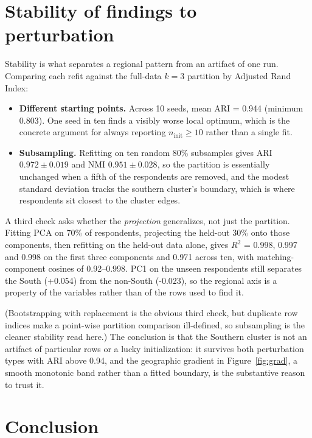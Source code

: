 \documentclass[10pt,letterpaper]{article}
\begin{document}
\section{Stability of findings to perturbation}\label{stability}

Stability is what separates a regional pattern from an artifact of one run.
Comparing each refit against the full-data $k=3$ partition by Adjusted Rand
Index:

\begin{itemize}
\item \textbf{Different starting points.} Across 10 seeds, mean ARI = 0.944
(minimum 0.803). One seed in ten finds a visibly worse local optimum, which is
the concrete argument for always reporting $n_{\mathrm{init}} \geq 10$ rather
than a single fit.
\item \textbf{Subsampling.} Refitting on ten random 80\% subsamples gives ARI
$0.972 \pm 0.019$ and NMI $0.951 \pm 0.028$, so the partition is essentially
unchanged when a fifth of the respondents are removed, and the modest standard
deviation tracks the southern cluster's boundary, which is where respondents
sit closest to the cluster edges.
\end{itemize}

A third check asks whether the \emph{projection} generalizes, not just the
partition. Fitting PCA on 70\% of respondents, projecting the held-out 30\% onto
those components, then refitting on the held-out data alone, gives $R^2$ =
0.998, 0.997 and 0.998 on the first three components and 0.971 across ten, with
matching-component cosines of 0.92--0.998. PC1 on the unseen respondents still
separates the South (+0.054) from the non-South (-0.023), so the regional axis
is a property of the variables rather than of the rows used to find it.

(Bootstrapping with replacement is the obvious third check, but duplicate row
indices make a point-wise partition comparison ill-defined, so subsampling is
the cleaner stability read here.) The conclusion is that the Southern cluster
is not an artifact of particular rows or a lucky initialization: it survives
both perturbation types with ARI above 0.94, and the geographic gradient in
Figure~\ref{fig:grad}, a smooth monotonic band rather than a fitted
boundary, is the substantive reason to trust it.

\section{Conclusion}\label{conclusion}
\end{document}
